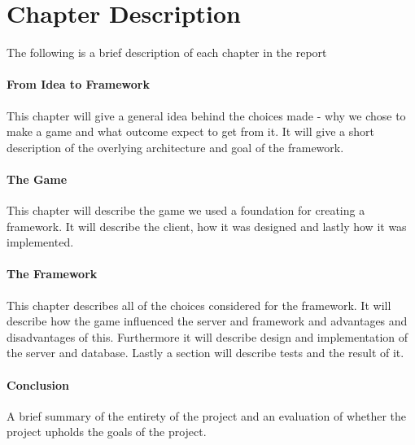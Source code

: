 \section{Chapter Description}
The following is a brief description of each chapter in the report

\paragraph{From Idea to Framework}
This chapter will give a general idea behind the choices made - why we chose to make a game and what outcome expect to get from it. It will give a short description of the overlying architecture and goal of the framework. 
\paragraph{The Game}
This chapter will describe the game we used a foundation for creating a framework. It will describe the client, how it was designed and lastly how it was implemented.
\paragraph{The Framework}
This chapter describes all of the choices considered for the framework. It will describe how the game influenced the server and framework and advantages and disadvantages of this. Furthermore it will describe design and implementation of the server and database. Lastly a section will describe tests and the result of it.
\paragraph{Conclusion}
A brief summary of the entirety of the project and an evaluation of whether the project upholds the goals of the project.
